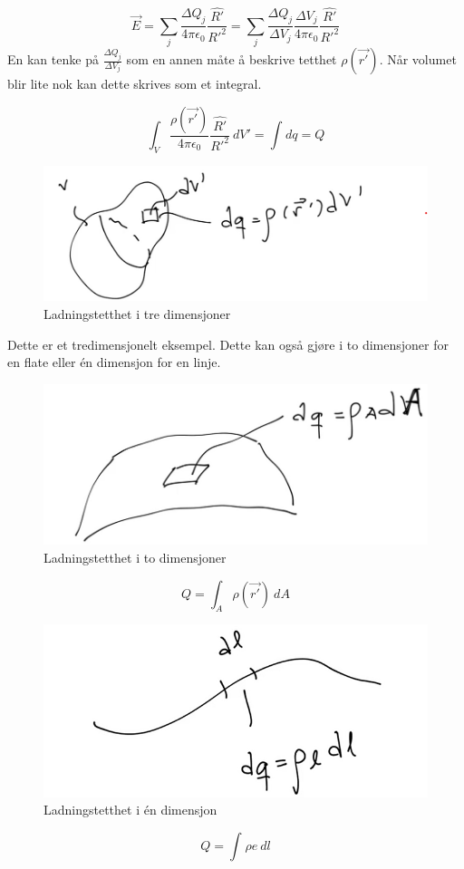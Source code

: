     \[
    \vec{E} = ∑ \limits_{j}^{} \frac{\Delta Q_j }{4 π \epsilon_0} \frac{\hat{R'}}{R'^{2}} = ∑ \limits_{j}^{} \frac{\Delta Q_j}{\Delta V_j} \frac{\Delta V_j }{4 π \epsilon_0} \frac{\hat{R'}}{R'^{2}}
    \]
    En kan tenke på $ \frac{\Delta Q_j}{\Delta V_j} $ som en annen måte å beskrive tetthet $ ρ(\vec{r'}) $. Når volumet blir lite nok kan dette skrives som et integral. 

    \[
    ∫_{V}^{} \frac{ρ(\vec{r'}) }{4 π \epsilon_0} \frac{\hat{R'}}{R'^{2}}\ dV' = ∫_{}^{} dq = Q
    \]
    \begin{figure}[h!]
      \centering
      \includegraphics[scale = .7]{Bilder/3D_Ladningstetthet.png}
      \caption{Ladningstetthet i tre dimensjoner }
      \label{fig: 3DLadningstetthet }
    \end{figure}
    Dette er et tredimensjonelt eksempel. Dette kan også gjøre i to dimensjoner for en flate eller én dimensjon for en linje. 
    \begin{figure}[h!]
      \centering
      \includegraphics[scale = .6]{Bilder/2D_Ladningstetthet.png}
      \caption{Ladningstetthet i to dimensjoner}
      \label{fig: 2DLadningstetthet}
    \end{figure}

    \[
    Q = ∫_{A}^{} ρ(\vec{r'}) \ dA
    \]

    \begin{figure}[h!]
      \centering
      \includegraphics[scale = .6]{Bilder/1D_Ladningstetthet.png}
      \caption{Ladningstetthet i én dimensjon}
      \label{fig: 1DLadningstetthet }
    \end{figure}
    \[
    Q = ∫_{}^{} ρ e\ dl
    \]

